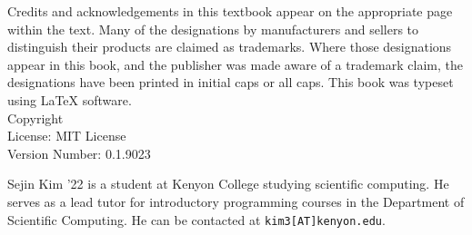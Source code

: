 \documentclass{book}
\makeatletter
\newcommand{\booklicense}{MIT License}
\newcommand{\bookversion}{0.1.9023}
\newcommand{\bookauthor}{\@author}
\makeatother
\begin{document}
\thispagestyle{empty}

\begin{flushleft}
\vspace*{\fill}
Credits and acknowledgements in this textbook appear on the appropriate page within the text.
\newline
\newline
Many of the designations by manufacturers and sellers to distinguish their products are claimed as trademarks. Where those designations appear in this book, and the publisher was made aware of a trademark claim, the designations have been printed in initial caps or all caps.
\newline
\newline
This book was typeset using \LaTeX{} software.\\
\vspace{\fill}
Copyright \textcopyright{} \the\year{}  \bookauthor\\
License: \booklicense\\
Version Number: \bookversion
\end{flushleft}

\addtocounter{page}{2}



\setcounter{tocdepth}{3}
\tableofcontents

\mainmatter



























\backmatter

\printindex

\noindent Sejin Kim '22 is a student at Kenyon College studying scientific computing. He serves as a lead tutor for introductory programming courses in the Department of Scientific Computing. He can be contacted at \verb|kim3[AT]kenyon.edu|.
\end{document}
